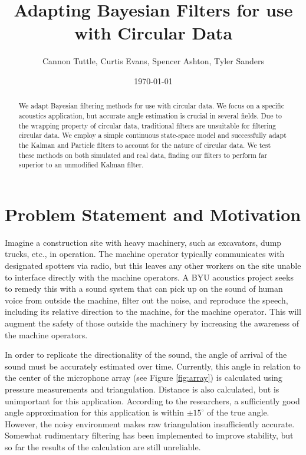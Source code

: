 \documentclass[11pt]{amsart}
\begin{document}
\title{Adapting Bayesian Filters for use with Circular Data}
\author{Cannon Tuttle, Curtis Evans, Spencer Ashton, Tyler Sanders}

\date{\today}

\begin{abstract}
We adapt Bayesian filtering methods for use with circular data. We focus on a specific acoustics application, but accurate angle estimation is crucial in several fields. Due to the wrapping property of circular data, traditional filters are unsuitable for filtering circular data. We employ a simple continuous state-space model and successfully adapt the Kalman and Particle filters to account for the nature of circular data. We test these methods on both simulated and real data, finding our filters to perform far superior to an unmodified Kalman filter.
\vspace{-\baselineskip}
\end{abstract}
\vspace{-\baselineskip}
\maketitle
\vspace{-\baselineskip}
\section{Problem Statement and Motivation}
Imagine a construction site with heavy machinery, such as excavators, dump trucks, etc.,  in operation. The machine operator typically communicates with designated spotters via radio, but this leaves any other workers on the site unable to interface directly with the machine operators. A BYU acoustics project seeks to remedy this with a sound system that can pick up on the sound of human voice from outside the machine, filter out the noise, and reproduce the speech, including its relative direction to the machine, for the machine operator.  This will augment the safety of those outside the machinery by increasing the awareness of the machine operators.

In order to replicate the directionality of the sound, the angle of arrival of the sound must be accurately estimated over time. Currently, this angle in relation to the center of the microphone array (see Figure \ref{fig:array}) is calculated using pressure measurements and triangulation. Distance is also calculated, but is unimportant for this application. According to the researchers, a sufficiently good angle approximation for this application is within $\pm15^{\circ}$ of the true angle. However, the noisy environment makes raw triangulation insufficiently accurate. Somewhat rudimentary filtering has been implemented to improve stability, but so far the results of the calculation are still unreliable.
\end{document}
